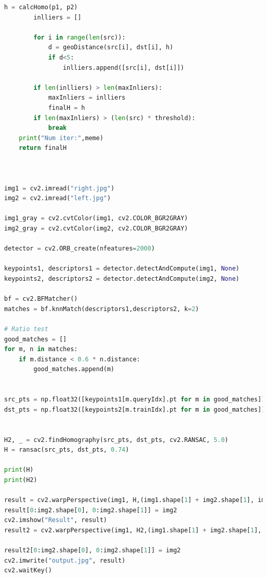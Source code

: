 \documentclass{article}
\begin{document}
\begin{appendices}
\begin{lstlisting}[language=python]
        h = calcHomo(p1, p2)
        inlliers = []

        for i in range(len(src)):
            d = geoDistance(src[i], dst[i], h)
            if d<5:
                inlliers.append([src[i], dst[i]])
        
        if len(inlliers) > len(maxInliers):
            maxInliers = inlliers
            finalH = h
        if len(maxInliers) > (len(src) * threshold):
            break
    print("Num iter:",meme)
    return finalH



img1 = cv2.imread("right.jpg")
img2 = cv2.imread("left.jpg")

img1_gray = cv2.cvtColor(img1, cv2.COLOR_BGR2GRAY)
img2_gray = cv2.cvtColor(img2, cv2.COLOR_BGR2GRAY)

detector = cv2.ORB_create(nfeatures=2000)

keypoints1, descriptors1 = detector.detectAndCompute(img1, None)
keypoints2, descriptors2 = detector.detectAndCompute(img2, None)

bf = cv2.BFMatcher()
matches = bf.knnMatch(descriptors1,descriptors2, k=2)

# Ratio test
good_matches = []
for m, n in matches:
    if m.distance < 0.6 * n.distance:
        good_matches.append(m)


src_pts = np.float32([keypoints1[m.queryIdx].pt for m in good_matches]).reshape(-1, 1, 2)
dst_pts = np.float32([keypoints2[m.trainIdx].pt for m in good_matches]).reshape(-1, 1, 2)


H2, _ = cv2.findHomography(src_pts, dst_pts, cv2.RANSAC, 5.0)
H = ransac(src_pts, dst_pts, 0.74)

print(H)
print(H2)

result = cv2.warpPerspective(img1, H,(img1.shape[1] + img2.shape[1], img1.shape[0]))
result[0:img2.shape[0], 0:img2.shape[1]] = img2
cv2.imshow("Result", result)
result2 = cv2.warpPerspective(img1, H2,(img1.shape[1] + img2.shape[1], img1.shape[0]))

result2[0:img2.shape[0], 0:img2.shape[1]] = img2
cv2.imwrite("output.jpg", result)
cv2.waitKey()
        \end{lstlisting}
    \end{appendices}
\end{document}
